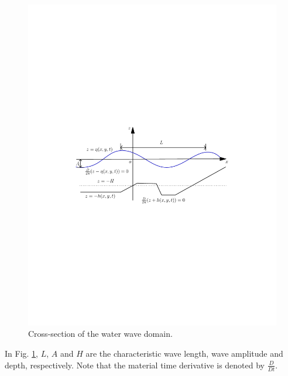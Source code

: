 \begin{figure}[!htb]
{\centering
\includegraphics[width=\largefig]{chapters/lopes/pdf/graph.pdf}
\caption{Cross-section of the water wave domain.}\label{lopes:fig:schematic}
\par}
\end{figure}
In Fig. \ref{lopes:fig:schematic}, \(L\), \(A\) and \(H\) are
the characteristic wave length, wave amplitude and
depth, respectively. Note that the material time derivative is
denoted by \(\frac{D}{D t}\).

